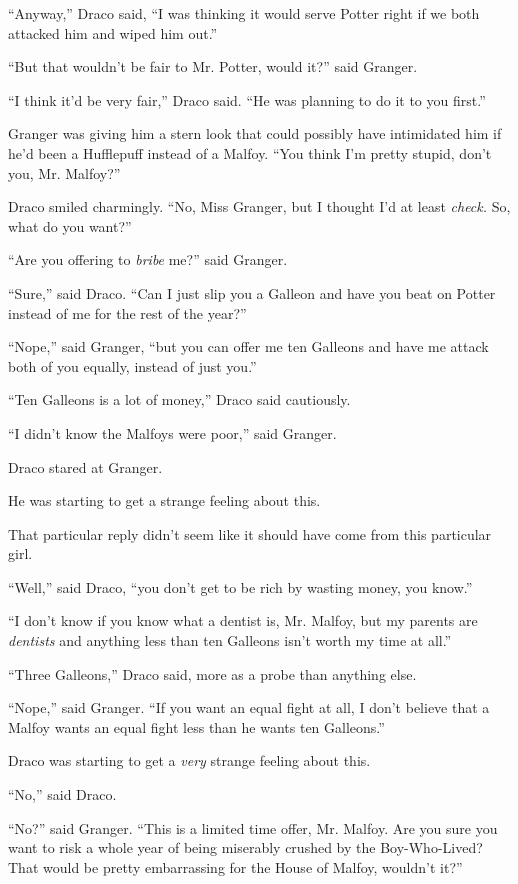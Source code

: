 ``Anyway,'' Draco said, ``I was thinking it would serve Potter right if we both attacked him and wiped him out.''

``But that wouldn't be fair to Mr. Potter, would it?'' said Granger.

``I think it'd be very fair,'' Draco said. ``He was planning to do it to you first.''

Granger was giving him a stern look that could possibly have intimidated him if he'd been a Hufflepuff instead of a Malfoy. ``You think I'm pretty stupid, don't you, Mr. Malfoy?''

Draco smiled charmingly. ``No, Miss Granger, but I thought I'd at least \emph{check.} So, what do you want?''

``Are you offering to \emph{bribe} me?'' said Granger.

``Sure,'' said Draco. ``Can I just slip you a Galleon and have you beat on Potter instead of me for the rest of the year?''

``Nope,'' said Granger, ``but you can offer me ten Galleons and have me attack both of you equally, instead of just you.''

``Ten Galleons is a lot of money,'' Draco said cautiously.

``I didn't know the Malfoys were poor,'' said Granger.

Draco stared at Granger.

He was starting to get a strange feeling about this.

That particular reply didn't seem like it should have come from this particular girl.

``Well,'' said Draco, ``you don't get to be rich by wasting money, you know.''

``I don't know if you know what a dentist is, Mr. Malfoy, but my parents are \emph{dentists} and anything less than ten Galleons isn't worth my time at all.''

``Three Galleons,'' Draco said, more as a probe than anything else.

``Nope,'' said Granger. ``If you want an equal fight at all, I don't believe that a Malfoy wants an equal fight less than he wants ten Galleons.''

Draco was starting to get a \emph{very} strange feeling about this.

``No,'' said Draco.

``No?'' said Granger. ``This is a limited time offer, Mr. Malfoy. Are you sure you want to risk a whole year of being miserably crushed by the Boy-Who-Lived? That would be pretty embarrassing for the House of Malfoy, wouldn't it?''

